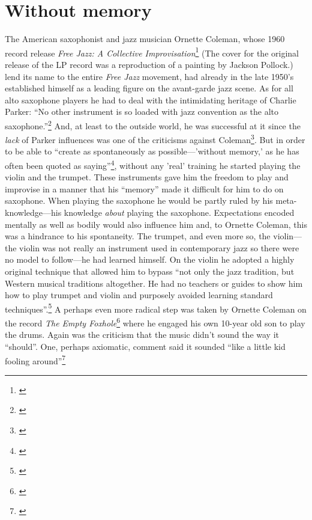 \section*{Without memory}
\label{sec:without-memory}

The American saxophonist and jazz musician Ornette Coleman, whose 1960
record release \emph{Free Jazz: A Collective
  Improvisation}\footnote{\citet{coleman60}} (The cover for the
original release of the LP record was a reproduction of a painting by
Jackson Pollock.) lend its name to the entire \emph{Free Jazz}
movement, had already in the late 1950's established himself as a
leading figure on the avant-garde jazz scene. As for all alto
saxophone players he had to deal with the intimidating heritage of
Charlie Parker: ``No other instrument is so loaded with jazz
convention as the alto saxophone.''\footnote{\citet[In my translation
  from Swedish][p. 12]{glanzelius67}} And, at least to the outside world,
he was successful at it since the \emph{lack} of Parker influences was
one of the criticisms against
Coleman\footnote{\citet[See][61-2]{litzweiler92}}. But in order to be
able to ``create as spontaneously as possible---'without memory,' as
he has often been quoted as
saying''\footnote{\citet[p. 117]{litzweiler92}}, without any 'real'
training he started playing the violin and the trumpet. These
instruments gave him the freedom to play and improvise in a manner
that his ``memory'' made it difficult for him to do on saxophone. When
playing the saxophone he would be partly ruled by his
meta-knowledge---his knowledge \emph{about} playing the
saxophone. Expectations encoded mentally as well as bodily would also
influence him and, to Ornette Coleman, this was a hindrance to his
spontaneity. The trumpet, and even more so, the violin---the violin
was not really an instrument used in contemporary jazz so there were
no model to follow---he had learned himself. On the violin he adopted
a highly original technique that allowed him to bypass ``not only the
jazz tradition, but Western musical traditions altogether. He had no
teachers or guides to show him how to play trumpet and violin and
purposely avoided learning standard
techniques''.\footnote{\citet[p. 117]{litzweiler92}} A perhaps even more
radical step was taken by Ornette Coleman on the record \emph{The
  Empty Foxhole}\footnote{\citet{coleman66}} where he engaged his own
10-year old son to play the drums. Again was the criticism that the
music didn't sound the way it ``should''. One, perhaps axiomatic,
comment said it sounded ``like a little kid fooling
around''\footnote{\citet[Freddie Hubbard cited in][p. 121]{litzweiler92}}
